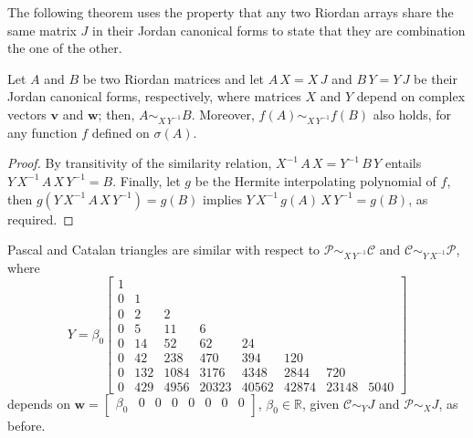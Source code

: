 \fi
The following theorem uses the property that any two Riordan arrays
share the same matrix $J$ in their Jordan canonical forms to state that they
are combination the one of the other.
\begin{theorem}
Let $A$ and $B$ be two Riordan matrices and let $A\,X = X\,J$ and $B\,Y= Y\,J$
be their Jordan canonical forms, respectively, where matrices $X$ and $Y$ depend
on complex vectors $\boldsymbol{v}$ and $\boldsymbol{w}$; then, $A
\sim_{X\,Y^{-1}} B$. Moreover, $f(A) \sim_{X\,Y^{-1}} f(B)$ also holds, for any
function $f$ defined on $\sigma(A)$.
\end{theorem}
\begin{proof}
By transitivity of the similarity relation, $X^{-1}\,A\,X = Y^{-1}\,B\,Y$
entails $Y\,X^{-1}\,A\,X\,Y^{-1} = B$. Finally, let $g$ be the Hermite
interpolating polynomial of $f$, then $g(Y\,X^{-1}\,A\,X\,Y^{-1}) = g(B)$
implies $Y\,X^{-1}\,g(A)\,X\,Y^{-1} = g(B)$, as required.
\end{proof}

\begin{example}
Pascal and Catalan triangles are similar with respect to
$\mathcal{P} \sim_{X\,Y^{-1}}\mathcal{C}$ and $\mathcal{C}
\sim_{Y\,X^{-1}}\mathcal{P}$, where
\begin{displaymath}
Y = \beta_{0} \left[\begin{matrix}1 &  &  &  &  &  &  & \\0 & 1 &  &  &  &  &  & \\0 & 2 & 2 &  &  &  &  & \\0 & 5 & 11 & 6 &  &  &  & \\0 & 14 & 52 & 62 & 24 &  &  & \\0 & 42 & 238 & 470 & 394 & 120 &  & \\0 & 132 & 1084 & 3176 & 4348 & 2844 & 720 & \\0 & 429 & 4956 & 20323 & 40562 & 42874 & 23148 & 5040\end{matrix}\right]
\end{displaymath}
depends on $\displaystyle\boldsymbol{w}= \left[\begin{matrix} \beta_{0} & 0 & 0 & 0 & 0 & 0 & 0 & 0 \end{matrix}\right]$, $\beta_{0}\in\mathbb{R}$,
given $\mathcal{C}\sim_{Y}J$ and $\mathcal{P}\sim_{X}J$, as before.
\end{example}


